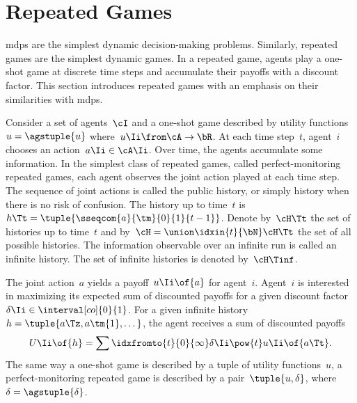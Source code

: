 \begin{figure}[htp]
\centering
{}
\label{fig:agent_knowledge_pomdp_state}
\end{figure}

\section{Repeated Games}

\Acp{mdp} are the simplest dynamic decision-making problems.
Similarly, repeated games are the simplest dynamic games.
In a repeated game, agents play a one-shot game at discrete time steps and accumulate their payoffs with a discount factor.
This section introduces repeated games with an emphasis on their similarities with \acp{mdp}.

Consider a set of agents~\(\cI\) and a one-shot game described by utility functions~\(u = \agstuple{u}\) where~\(u\Ii \from \cA \to \bR \).
At each time step~\(t\), agent~\(i\) chooses an action~\(a\Ii \in \cA\Ii\).
Over time, the agents accumulate some information.
In the simplest class of repeated games, called perfect-monitoring repeated games, each agent observes the joint action played at each time step.
The sequence of joint actions is called the public history, or simply history when there is no risk of confusion.
The history up to time~\(t\) is~\(h\Tt = \tuple{\sseqcom{a}{\tm}{0}{1}{t-1}}\).
Denote by~\(\cH\Tt\) the set of histories up to time~\(t\) and by~\(\cH = \union\idxin{t}{\bN} \cH\Tt\) the set of all possible histories.
The information observable over an infinite run is called an infinite history.
The set of infinite histories is denoted by~\(\cH\Tinf\).

The joint action~\(a\) yields a payoff~\(u\Ii \of {a}\) for agent~\(i\).
Agent~\(i\) is interested in maximizing its expected sum of discounted payoffs for a given discount factor~\(\delta\Ii \in \interval[co]{0}{1}\).
For a given infinite history~\(h = \tuple{a\Tz, a\tm{1}, \dots}\), the agent receives a sum of discounted payoffs~
\[
U\Ii \of{h} = \sum \idxfromto{t}{0}{\infty} \delta\Ii \pow {t} u\Ii \of {a\Tt}.
\]
The same way a one-shot game is described by a tuple of utility functions~\(u\), a perfect-monitoring repeated game is described by a pair~\(\tuple{u, \delta}\), where \(\delta = \agstuple{\delta}\).

